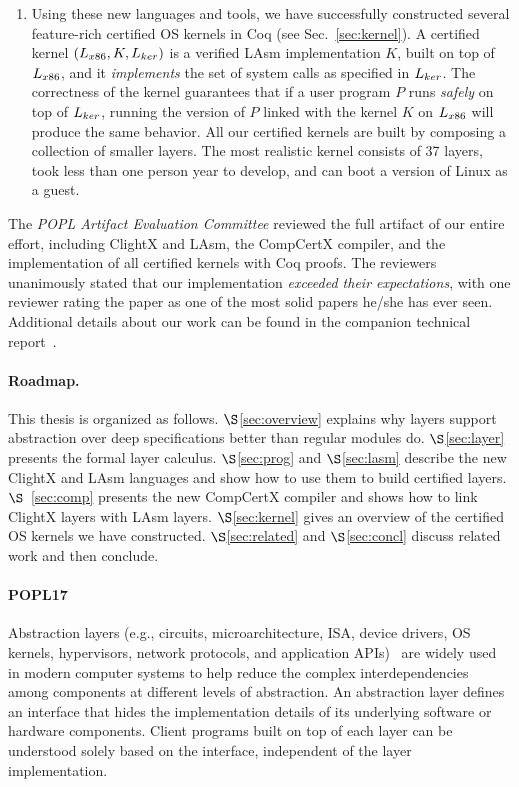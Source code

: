 {\begin{enumerate}
\item Using these new languages and tools, we have successfully
  constructed several feature-rich certified OS kernels in Coq (see
  Sec.~\ref{sec:kernel}).  A certified kernel
  $(L_{x86},K,L_{ker})$ is a verified LAsm implementation
  $K$, built on top of $L_{x86}$, and it {\em implements} the set of
  system calls as specified in $L_{ker}$.  The correctness of the
  kernel guarantees that if a user program $P$ runs {\em safely} on
  top of $L_{ker}$, running the version of $P$ linked with the kernel
  $K$ on $L_{x86}$ will produce the same behavior.  All our certified
  kernels are built by composing a collection of smaller layers.
  The most realistic kernel consists of 37 layers, took less than one
  person year to develop, and can boot a version of Linux as a guest.
\end{enumerate}

\noindent{}The {\em POPL Artifact Evaluation Committee} reviewed the
full artifact of our entire effort, including ClightX and LAsm,
the CompCertX compiler, and the implementation of all
certified kernels with Coq proofs. 
The reviewers unanimously stated
that our implementation {\em exceeded their expectations}, with one
reviewer rating the paper as one of the most solid papers he/she has
ever seen. Additional details about our work can be found in
the companion technical report~\cite{dscal14tr}.
%
%

\paragraph{Roadmap.}
This thesis is organized as follows.
$\S$\ref{sec:overview} explains why layers support 
abstraction over deep specifications better than regular modules do.
$\S$\ref{sec:layer} presents the formal layer calculus.
$\S$\ref{sec:prog} and $\S$\ref{sec:lasm} describe the new ClightX and
LAsm languages and show how to use them to build certified layers.
$\S$~\ref{sec:comp} presents the new CompCertX compiler and shows how
to link ClightX layers with LAsm layers.  $\S$\ref{sec:kernel} gives
an overview of the certified OS kernels we have constructed.
$\S$\ref{sec:related} and $\S$\ref{sec:concl} discuss related work and
then conclude.


\paragraph{POPL17}
Abstraction layers (e.g., circuits, microarchitecture, ISA, device
drivers, OS kernels, hypervisors, network protocols, and application
APIs)~\cite{salzer09,baldwin00} are widely used in modern computer
systems to help reduce the complex interdependencies among components
at different levels of abstraction.  An abstraction layer defines an
interface that hides the implementation details of its underlying
software or hardware components. Client programs built on top of each
layer can be understood solely based on the interface, independent of
the layer implementation.

}
